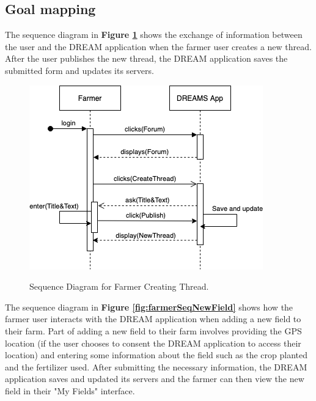 %

% 
\subsection{Goal mapping}


\begin{flushleft}
The sequence diagram in \textbf{Figure \ref{fig:farmerSeqNewThread}} shows the exchange of information between the user and the DREAM application when the farmer user creates a new thread. After the user publishes the new thread, the DREAM application saves the submitted form and updates its servers.
\end{flushleft}

\begin{figure}[hbt!]
\centering
\includegraphics[scale=0.6]{Files/sequence_disgrams/thePNGs/farmer_createThread.png}\\
\caption{\label{fig:farmerSeqNewThread}Sequence Diagram for Farmer Creating Thread.}
\end{figure}


\begin{flushleft}
The sequence diagram in \textbf{Figure \ref{fig:farmerSeqNewField}} shows how the farmer user interacts with the DREAM application when adding a new field to their farm. Part of adding a new field to their farm involves providing the GPS location (if the user chooses to consent the DREAM application to access their location) and entering some information about the field such as the crop planted and the fertilizer used. After submitting the necessary information, the DREAM application saves and updated its servers and the farmer can then view the new field in their "My Fields" interface.
\end{flushleft}


